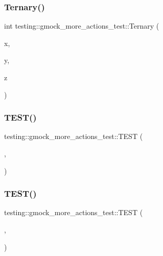 \subsubsection{\texorpdfstring{Ternary()}{Ternary()}}
{\footnotesize\ttfamily int testing\+::gmock\+\_\+more\+\_\+actions\+\_\+test\+::\+Ternary (\begin{DoxyParamCaption}\item[{int}]{x,  }\item[{char}]{y,  }\item[{short}]{z }\end{DoxyParamCaption})}

\mbox{\label{namespacetesting_1_1gmock__more__actions__test_a9c5fbd26c6cc6ed31aed5bafb2fa8e5c}} 
\subsubsection{\texorpdfstring{T\+E\+S\+T()}{TEST()}\hspace{0.1cm}{\footnotesize\ttfamily [1/47]}}
{\footnotesize\ttfamily testing\+::gmock\+\_\+more\+\_\+actions\+\_\+test\+::\+T\+E\+ST (\begin{DoxyParamCaption}\item[{Invoke\+Test}]{,  }\item[{\hyperlink{namespacetesting_1_1gmock__more__actions__test_acdd2dd80f777fdb770b513b63064ac19}{Nullary}}]{ }\end{DoxyParamCaption})}

\mbox{\label{namespacetesting_1_1gmock__more__actions__test_a28b57a9f9d38574b7c033988ad528ddd}} 
\subsubsection{\texorpdfstring{T\+E\+S\+T()}{TEST()}\hspace{0.1cm}{\footnotesize\ttfamily [2/47]}}
{\footnotesize\ttfamily testing\+::gmock\+\_\+more\+\_\+actions\+\_\+test\+::\+T\+E\+ST (\begin{DoxyParamCaption}\item[{Invoke\+Test}]{,  }\item[{\hyperlink{namespacetesting_1_1gmock__more__actions__test_aad456ea2ee1b0cb2741b676a34f540a3}{Unary}}]{ }\end{DoxyParamCaption})}

